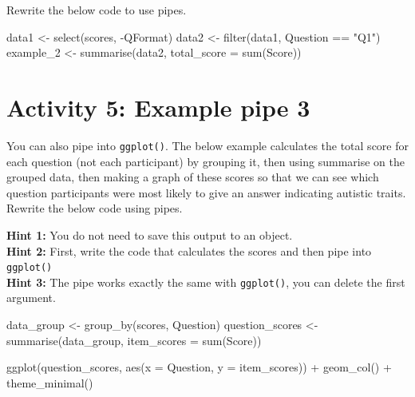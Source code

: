 \documentclass[
  oneside]{book}
\newenvironment{Shaded}{\begin{snugshade}}{\end{snugshade}}
\newcommand{\AttributeTok}[1]{\textcolor[rgb]{0.77,0.63,0.00}{#1}}
\newcommand{\FunctionTok}[1]{\textcolor[rgb]{0.00,0.00,0.00}{#1}}
\newcommand{\NormalTok}[1]{#1}
\newcommand{\OtherTok}[1]{\textcolor[rgb]{0.56,0.35,0.01}{#1}}
\newcommand{\SpecialCharTok}[1]{\textcolor[rgb]{0.00,0.00,0.00}{#1}}
\newcommand{\StringTok}[1]{\textcolor[rgb]{0.31,0.60,0.02}{#1}}
\begin{document}
Rewrite the below code to use pipes.

\begin{Shaded}
\begin{Highlighting}[]
\NormalTok{data1 }\OtherTok{\textless{}{-}} \FunctionTok{select}\NormalTok{(scores, }\SpecialCharTok{{-}}\NormalTok{QFormat)}
\NormalTok{data2 }\OtherTok{\textless{}{-}} \FunctionTok{filter}\NormalTok{(data1, Question }\SpecialCharTok{==} \StringTok{"Q1"}\NormalTok{)}
\NormalTok{example\_2 }\OtherTok{\textless{}{-}} \FunctionTok{summarise}\NormalTok{(data2, }\AttributeTok{total\_score =} \FunctionTok{sum}\NormalTok{(Score))}
\end{Highlighting}
\end{Shaded}

\hypertarget{activity-5-example-pipe-3}{%
\section{Activity 5: Example pipe 3}\label{activity-5-example-pipe-3}}

You can also pipe into \texttt{ggplot()}. The below example calculates the total score for each question (not each participant) by grouping it, then using summarise on the grouped data, then making a graph of these scores so that we can see which question participants were most likely to give an answer indicating autistic traits. Rewrite the below code using pipes.

\textbf{Hint 1:} You do not need to save this output to an object.\\
\textbf{Hint 2:} First, write the code that calculates the scores and then pipe into \texttt{ggplot()}\\
\textbf{Hint 3:} The pipe works exactly the same with \texttt{ggplot()}, you can delete the first argument.

\begin{Shaded}
\begin{Highlighting}[]
\NormalTok{data\_group }\OtherTok{\textless{}{-}} \FunctionTok{group\_by}\NormalTok{(scores, Question)}
\NormalTok{question\_scores }\OtherTok{\textless{}{-}} \FunctionTok{summarise}\NormalTok{(data\_group, }\AttributeTok{item\_scores =} \FunctionTok{sum}\NormalTok{(Score))}

\FunctionTok{ggplot}\NormalTok{(question\_scores, }\FunctionTok{aes}\NormalTok{(}\AttributeTok{x =}\NormalTok{ Question, }\AttributeTok{y =}\NormalTok{ item\_scores)) }\SpecialCharTok{+}
  \FunctionTok{geom\_col}\NormalTok{() }\SpecialCharTok{+}
  \FunctionTok{theme\_minimal}\NormalTok{()}
\end{Highlighting}
\end{Shaded}
\end{document}
